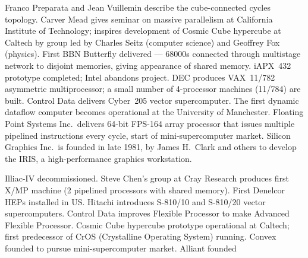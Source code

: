 	{Franco Preparata and Jean Vuillemin describe
	the cube-connected cycles topology.}
	{Carver Mead gives seminar on massive parallelism at
	California Institute of Technology;
	inspires development of Cosmic Cube hypercube at Caltech
	by group led by Charles Seitz (computer science)
	and Geoffrey Fox (physics).}
	{First BBN Butterfly delivered ---
	68000s connected through multistage network to disjoint memories,
	giving appearance of shared memory.}
	{iAPX~432 prototype completed; Intel abandons project.}
	{DEC produces VAX~11/782 asymmetric multiprocessor;
	a small number of 4-processor machines (11/784) are built.}
	{Control Data delivers Cyber~205 vector supercomputer.}
	{The first dynamic dataflow computer becomes operational
	at the University of Manchester.}
	{Floating Point Systems Inc.\ delivers 64-bit FPS-164
	array processor that issues multiple pipelined instructions 
	every cycle,
	start of mini-supercomputer market.}
        {Silicon Graphics Inc.\ is founded in late 1981, by James H.\ Clark
        and others to develop the IRIS, a high-performance
        graphics workstation.} 

	{Illiac-IV decommissioned.}
	{Steve Chen's group at Cray Research produces first
	X/MP machine (2 pipelined processors with shared memory).}
	{First Denelcor HEPs installed in US.}
	{Hitachi introduces S-810/10 and S-810/20 vector supercomputers.}
	{Control Data improves Flexible Processor to make
	Advanced Flexible Processor.} 
	{Cosmic Cube hypercube prototype operational at Caltech;
	first predecessor of CrOS (Crystalline Operating System) running.}
	{Convex founded to pursue mini-supercomputer market.}
	{Alliant founded}

